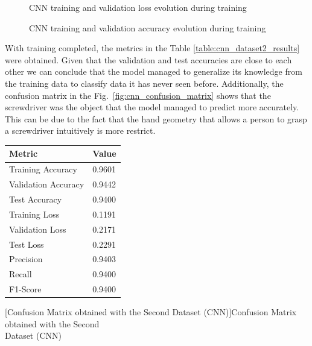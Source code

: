 \begin{figure}[H]
\centerline{}
\caption[CNN training and validation loss evolution during training]{CNN training and validation loss evolution during training}
\label{fig:cnn_loss}
\end{figure}

\begin{figure}[H]
\centerline{}
\caption[CNN training and validation accuracy evolution during training]{CNN training and validation accuracy evolution during training}
\label{fig:cnn_acc}
\end{figure}

With training completed, the metrics in the Table \ref{table:cnn_dataset2_results} were obtained. Given that the validation and test accuracies are close to each other we can conclude that the model managed to generalize its knowledge from the training data to classify data it has never seen before. Additionally, the confusion matrix in the Fig.~\ref{fig:cnn_confusion_matrix} shows that the screwdriver was the object that the model managed to predict more accurately. This can be due to the fact that the hand geometry that allows a person to grasp a screwdriver intuitively is more restrict.

\begin{minipage}{0.35\textwidth}
    \centering
    \captionsetup{justification=centering}
    \label{table:cnn_dataset2_results}
    \begin{tabular}{ |l|l| }
    \hline
    Metric & Value \\
    \hline
    Training Accuracy & 0.9601 \\
    \hline
    Validation Accuracy & 0.9442 \\
    \hline
    Test Accuracy & 0.9400 \\
    \hline
    Training Loss & 0.1191 \\
    \hline
    Validation Loss & 0.2171 \\
    \hline
    Test Loss & 0.2291 \\
    \hline
    Precision & 0.9403 \\
    \hline
    Recall & 0.9400 \\
    \hline
    F1-Score & 0.9400 \\
    \hline
    \end{tabular}
\end{minipage}%
\begin{minipage}{0.65\textwidth}
    \centering
    \captionsetup{justification=centering}
    
    [Confusion Matrix obtained with the Second Dataset (CNN)]{Confusion Matrix obtained with the Second\\Dataset (CNN)}
    \label{fig:cnn_dataset2_confusion_matrix}
\end{minipage}

